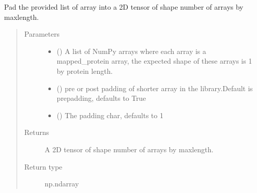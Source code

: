 \documentclass[letterpaper,10pt,english]{sphinxmanual}
\begin{document}
\begin{fulllineitems}
\label{\detokenize{IPTK.Utils:IPTK.Utils.UtilityFunction.pad_mapped_proteins}}
Pad the provided list of array into a 2D tensor of shape number of arrays by maxlength.
\begin{quote}\begin{description}
\item[{Parameters}] \leavevmode\begin{itemize}
\item {} 
 (\sphinxstyleliteralemphasis{\sphinxupquote{{[}}}\sphinxstyleliteralemphasis{\sphinxupquote{{]}}}) \textendash{} A list of NumPy arrays where each array is a mapped\_protein array,     the expected shape of these arrays is 1 by protein length.

\item {} 
 (\sphinxstyleliteralemphasis{\sphinxupquote{, }}) \textendash{} pre or post padding of shorter array in the library.Default is pre\sphinxhyphen{}padding, defaults to True

\item {} 
 (\sphinxstyleliteralemphasis{\sphinxupquote{, }}) \textendash{} The padding char, defaults to \sphinxhyphen{}1

\end{itemize}

\item[{Returns}] \leavevmode
A 2D tensor of shape number of arrays by maxlength.

\item[{Return type}] \leavevmode
np.ndarray

\end{description}\end{quote}

\end{fulllineitems}
\end{document}
